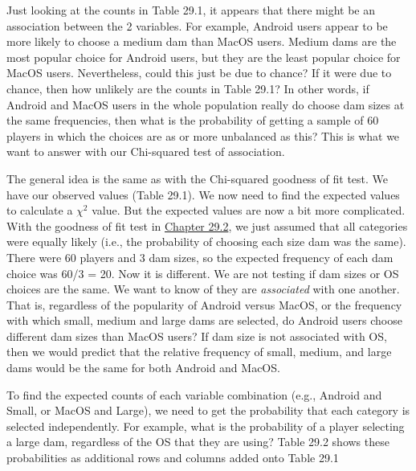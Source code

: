 \documentclass[
]{scrbook}
\begin{document}
Just looking at the counts in Table 29.1, it appears that there might be an association between the 2 variables.
For example, Android users appear to be more likely to choose a medium dam than MacOS users.
Medium dams are the most popular choice for Android users, but they are the least popular choice for MacOS users.
Nevertheless, could this just be due to chance?
If it were due to chance, then how unlikely are the counts in Table 29.1?
In other words, if Android and MacOS users in the whole population really do choose dam sizes at the same frequencies, then what is the probability of getting a sample of 60 players in which the choices are as or more unbalanced as this?
This is what we want to answer with our Chi-squared test of association.

The general idea is the same as with the Chi-squared goodness of fit test.
We have our observed values (Table 29.1).
We now need to find the expected values to calculate a \(\chi^{2}\) value.
But the expected values are now a bit more complicated.
With the goodness of fit test in \protect\hyperlink{chi-squared-goodness-of-fit}{Chapter 29.2}, we just assumed that all categories were equally likely (i.e., the probability of choosing each size dam was the same).
There were 60 players and 3 dam sizes, so the expected frequency of each dam choice was 60/3 = 20.
Now it is different.
We are not testing if dam sizes or OS choices are the same.
We want to know of they are \emph{associated} with one another.
That is, regardless of the popularity of Android versus MacOS, or the frequency with which small, medium and large dams are selected, do Android users choose different dam sizes than MacOS users?
If dam size is not associated with OS, then we would predict that the relative frequency of small, medium, and large dams would be the same for both Android and MacOS.

To find the expected counts of each variable combination (e.g., Android and Small, or MacOS and Large), we need to get the probability that each category is selected independently.
For example, what is the probability of a player selecting a large dam, regardless of the OS that they are using?
Table 29.2 shows these probabilities as additional rows and columns added onto Table 29.1
\end{document}
